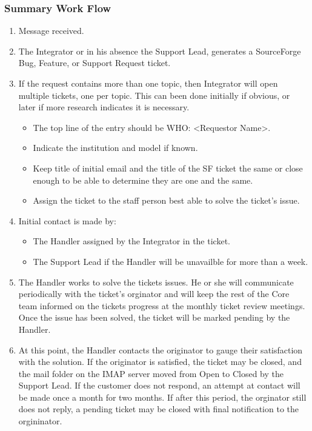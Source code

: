 \subsubsection{Summary Work Flow}
\begin{enumerate}
\item Message received.
\item The Integrator or in his absence the Support Lead, generates a SourceForge Bug, Feature, or Support Request ticket.
\item If the request contains more than one topic, then Integrator will open multiple tickets, one per topic. This can been done initially if obvious, or later if more research indicates it is necessary. 
   \begin{itemize}
   \item The top line of the entry should be WHO: <Requestor Name>.
   \item Indicate the institution and model if known.
   \item Keep title of initial email and the title of the SF ticket the
same or close enough to be able to determine they are one and the same.
   \item Assign the ticket to the staff person best able to solve the ticket's issue. 
   \end{itemize}

\item Initial contact is made by:

\begin{itemize}
\item The Handler assigned by the Integrator in the ticket. 
\item The Support Lead if the Handler will be unavailble for more than a week. 
\end{itemize}

\item The Handler works to solve the tickets issues. He or she will communicate 
periodically with the ticket's orginator and will keep the rest of the Core team 
informed on the tickets progress at the monthly ticket review meetings.  Once the 
issue has been solved, the ticket will be marked pending by the Handler.  

\item At this point, the Handler contacts the originator to gauge their satisfaction with
the solution. If the originator is satisfied, the ticket may be closed, and the mail 
folder on the IMAP server moved from Open to Closed by the Support Lead.  If the customer
does not respond, an attempt at contact will be made once a month for two months. 
If after this period, the orginator still does not reply, a pending ticket may be closed
with final notification to the orgininator.   
\end{enumerate}

